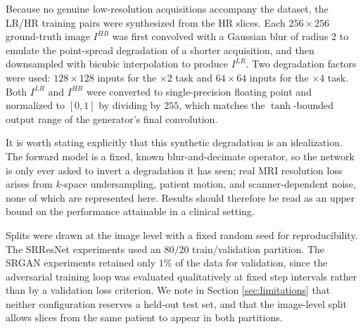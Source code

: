 \documentclass[conference]{IEEEtran}
\begin{document}
Because no genuine low-resolution acquisitions accompany the dataset, the LR/HR training pairs were synthesized from the HR slices. Each $256 \times 256$ ground-truth image $I^{HR}$ was first convolved with a Gaussian blur of radius $2$ to emulate the point-spread degradation of a shorter acquisition, and then downsampled with bicubic interpolation to produce $I^{LR}$. Two degradation factors were used: $128 \times 128$ inputs for the $\times 2$ task and $64 \times 64$ inputs for the $\times 4$ task. Both $I^{LR}$ and $I^{HR}$ were converted to single-precision floating point and normalized to $[0,1]$ by dividing by $255$, which matches the $\tanh$-bounded output range of the generator's final convolution.

It is worth stating explicitly that this synthetic degradation is an idealization. The forward model is a fixed, known blur-and-decimate operator, so the network is only ever asked to invert a degradation it has seen; real MRI resolution loss arises from $k$-space undersampling, patient motion, and scanner-dependent noise, none of which are represented here. Results should therefore be read as an upper bound on the performance attainable in a clinical setting.

Splits were drawn at the image level with a fixed random seed for reproducibility. The SRResNet experiments used an $80/20$ train/validation partition. The SRGAN experiments retained only $1\%$ of the data for validation, since the adversarial training loop was evaluated qualitatively at fixed step intervals rather than by a validation loss criterion. We note in Section \ref{sec:limitations} that neither configuration reserves a held-out test set, and that the image-level split allows slices from the same patient to appear in both partitions.
\end{document}
